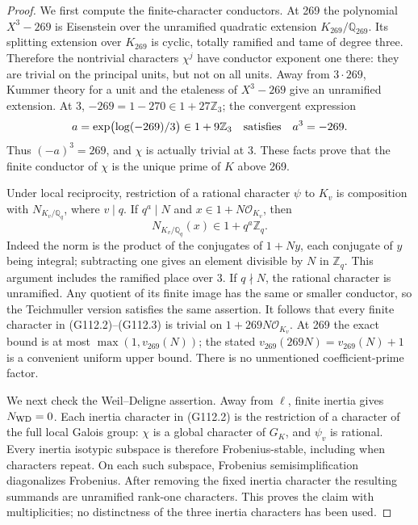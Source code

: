\begin{proof}
We first compute the finite-character conductors.  At 269 the polynomial
\(X^3-269\) is Eisenstein over the unramified quadratic extension
\(K_{269}/\mathbb Q_{269}\).  Its splitting extension over \(K_{269}\)
is cyclic, totally ramified and tame of degree three.  Therefore the
nontrivial characters \(\chi^j\) have conductor exponent one there:
they are trivial on the principal units, but not on all units.
Away from \(3\cdot269\), Kummer theory for a unit and the etaleness of
\(X^3-269\) give an unramified extension.  At 3,
\(-269=1-270\in1+27\mathbb Z_3\); the convergent expression
\[
 a=\exp\bigl(\log(-269)/3\bigr)\in1+9\mathbb Z_3
 \quad\hbox{satisfies}\quad a^3=-269.
\]
Thus \((-a)^3=269\), and \(\chi\) is actually trivial at 3.
These facts prove that the finite conductor of \(\chi\) is the unique
prime of \(K\) above 269.

Under local reciprocity, restriction of a rational character \(\psi\)
to \(K_v\) is composition with \(N_{K_v/\mathbb Q_q}\), where \(v\mid q\).
If \(q^a\mid N\) and \(x\in1+N\mathcal O_{K_v}\), then
\[
       N_{K_v/\mathbb Q_q}(x)\in1+q^a\mathbb Z_q.
       \tag{G112.5}
\]
Indeed the norm is the product of the conjugates of \(1+Ny\), each
conjugate of \(y\) being integral; subtracting one gives an element
divisible by \(N\) in \(\mathbb Z_q\).  This argument includes the
ramified place over 3.  If \(q\nmid N\), the rational character is
unramified.  Any quotient of its finite image has the same or smaller
conductor, so the Teichmuller version satisfies the same assertion.
It follows that every finite character in (G112.2)--(G112.3) is trivial
on \(1+269N\mathcal O_{K_v}\).  At 269 the exact bound is at most
\(\max(1,v_{269}(N))\); the stated \(v_{269}(269N)=v_{269}(N)+1\)
is a convenient uniform upper bound.  There is no unmentioned
coefficient-prime factor.

We next check the Weil--Deligne assertion.  Away from \(\ell\), finite
inertia gives \(N_{\rm WD}=0\).  Each inertia character in (G112.2)
is the restriction of a character of the full local Galois group:
\(\chi\) is a global character of \(G_K\), and \(\psi_v\) is rational.
Every inertia isotypic subspace is therefore Frobenius-stable, including
when characters repeat.  On each such subspace, Frobenius
semisimplification diagonalizes Frobenius.  After removing the fixed
inertia character the resulting summands are unramified rank-one
characters.  This proves the claim with multiplicities; no distinctness
of the three inertia characters has been used.


\end{proof}
